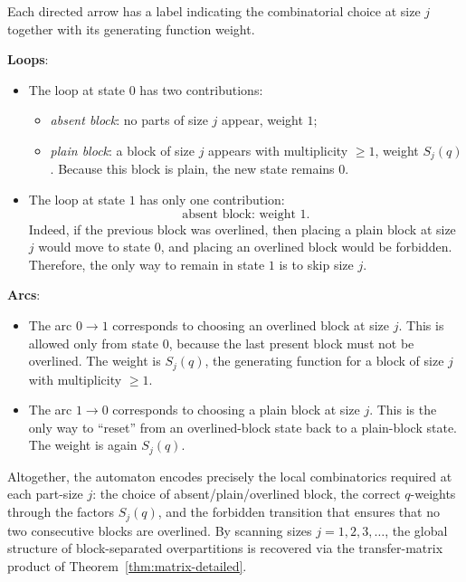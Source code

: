 \documentclass[letterpaper,12pt]{article}
\begin{document}
Each directed arrow has a label indicating the combinatorial choice at size
\(j\) together with its generating function weight.

 
\textbf{Loops}:  
\begin{itemize}
  \item The loop at state \(0\) has two contributions:
  \begin{itemize}
    \item \emph{absent block}: no parts of size \(j\) appear, weight \(1\);
    \item \emph{plain block}: a block of size \(j\) appears with multiplicity
    \(\ge1\), weight \(S_j(q)\). Because this block is plain, the new state
    remains \(0\).
  \end{itemize}
  \item The loop at state \(1\) has only one contribution:
  \[
  \text{absent block: weight } 1.
  \]
  Indeed, if the previous block was overlined, then placing a plain block at
  size \(j\) would move to state \(0\), and placing an overlined block would be
  forbidden. Therefore, the only way to remain in state \(1\) is to skip size
  \(j\).
\end{itemize}

 
\textbf{Arcs}:  
\begin{itemize}
  \item The arc \(0 \to 1\) corresponds to choosing an overlined block
  at size \(j\). This is allowed only from state \(0\), because the last present
  block must not be overlined. The weight is \(S_j(q)\), the generating function
  for a block of size \(j\) with multiplicity \(\ge1\).
  \item The arc \(1 \to 0\) corresponds to choosing a plain block at size
  \(j\). This is the only way to ``reset'' from an overlined-block state back to
  a plain-block state. The weight is again \(S_j(q)\).
\end{itemize}



Altogether, the automaton encodes precisely the local combinatorics required at
each part-size \(j\): the choice of absent/plain/overlined block, the correct
\(q\)-weights through the factors \(S_j(q)\), and the forbidden transition that
ensures that no two consecutive blocks are overlined. By scanning sizes
\(j=1,2,3,\ldots\), the global structure of block-separated overpartitions is
recovered via the transfer-matrix product of Theorem~\ref{thm:matrix-detailed}.
\end{document}
